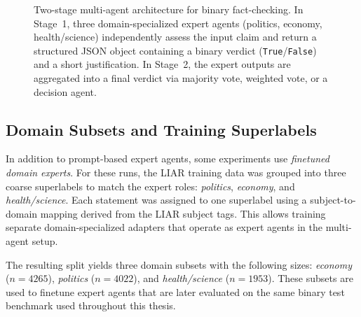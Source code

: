 \begin{figure}[ht]
{
}
\caption{Two-stage multi-agent architecture for binary fact-checking. In Stage~1, three domain-specialized expert agents (politics, economy, health/science) independently assess the input claim and return a structured JSON object containing a binary verdict (\texttt{True}/\texttt{False}) and a short justification. In Stage~2, the expert outputs are aggregated into a final verdict via majority vote, weighted vote, or a decision agent.}
\label{fig:multiagent}
\end{figure}

\subsection{Domain Subsets and Training Superlabels}

In addition to prompt-based expert agents, some experiments use \emph{finetuned domain experts}.
For these runs, the LIAR training data was grouped into three coarse superlabels to match the expert roles:
\textit{politics}, \textit{economy}, and \textit{health/science}.
Each statement was assigned to one superlabel using a subject-to-domain mapping derived from the LIAR subject tags.
This allows training separate domain-specialized adapters that operate as expert agents in the multi-agent setup.

The resulting split yields three domain subsets with the following sizes:
\textit{economy} ($n=4265$), \textit{politics} ($n=4022$), and \textit{health/science} ($n=1953$).
These subsets are used to finetune expert agents that are later evaluated on the same binary test benchmark used throughout this thesis.

